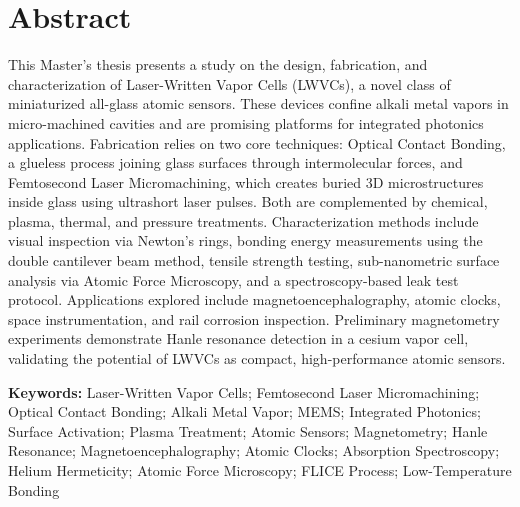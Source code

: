 \documentclass[11pt,english,a4paper,hidelinks]{book}
\begin{document}
\section*{Abstract}
\noindent
This Master's thesis presents a study on the design, fabrication, and
characterization of Laser-Written Vapor Cells (LWVCs), a novel class
of miniaturized all-glass atomic sensors. These devices confine alkali
metal vapors in micro-machined cavities and are promising platforms for
integrated photonics applications. Fabrication relies on two core
techniques: Optical Contact Bonding, a glueless process joining glass
surfaces through intermolecular forces, and Femtosecond Laser
Micromachining, which creates buried 3D microstructures inside glass
using ultrashort laser pulses. Both are complemented by chemical,
plasma, thermal, and pressure treatments. Characterization methods
include visual inspection via Newton's rings, bonding energy
measurements using the double cantilever beam method, tensile strength
testing, sub-nanometric surface analysis via Atomic Force Microscopy,
and a spectroscopy-based leak test protocol. Applications explored
include magnetoencephalography, atomic clocks, space instrumentation,
and rail corrosion inspection. Preliminary magnetometry experiments
demonstrate Hanle resonance detection in a cesium vapor cell,
validating the potential of LWVCs as compact, high-performance
atomic sensors.

\vspace{0.8em}
\noindent\textbf{Keywords:}
Laser-Written Vapor Cells; Femtosecond Laser Micromachining; Optical
Contact Bonding; Alkali Metal Vapor; MEMS; Integrated Photonics;
Surface Activation; Plasma Treatment; Atomic Sensors; Magnetometry;
Hanle Resonance; Magnetoencephalography; Atomic Clocks; Absorption
Spectroscopy; Helium Hermeticity; Atomic Force Microscopy;
FLICE Process; Low-Temperature Bonding

\newpage
\def\TFGTFM{\textcolor{red}{TFM}} 
\def\NOMBRETITULO{\textcolor{red}{MUQIP}} 
\def\NOMBREDISCIPLINA{\textcolor{red}{Fotónica y Tecnologías Cuánticas}} 
\end{document}
